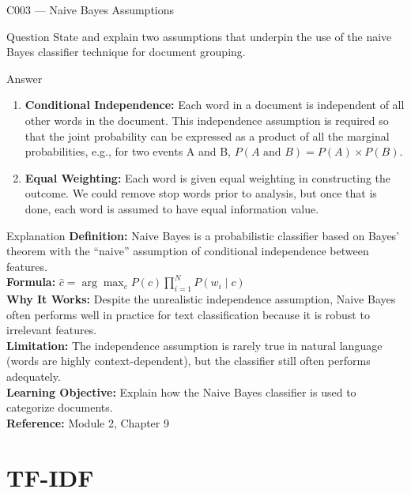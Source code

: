 \documentclass[aspectratio=169,8pt]{beamer}
\begin{document}
	\begin{frame}{C003 --- Naive Bayes Assumptions}
		\begin{block}{Question}
			State and explain two assumptions that underpin the use of the naive Bayes classifier technique for document grouping.
		\end{block}
		\begin{block}{Answer}
			\begin{enumerate}
				\item \textbf{Conditional Independence:} Each word in a document is independent of all other words in the document. This independence assumption is required so that the joint probability can be expressed as a product of all the marginal probabilities, e.g., for two events A and B, $P(A \text{ and } B) = P(A) \times P(B)$.\\
				\item \textbf{Equal Weighting:} Each word is given equal weighting in constructing the outcome. We could remove stop words prior to analysis, but once that is done, each word is assumed to have equal information value.
			\end{enumerate}
		\end{block}
		\begin{block}{Explanation}
			\textbf{Definition:} Naive Bayes is a probabilistic classifier based on Bayes' theorem with the ``naive'' assumption of conditional independence between features.\\
			\textbf{Formula:} $\hat{c} = \arg\max_{c} P(c) \prod_{i=1}^{N} P(w_i \mid c)$\\
			\textbf{Why It Works:} Despite the unrealistic independence assumption, Naive Bayes often performs well in practice for text classification because it is robust to irrelevant features.\\
			\textbf{Limitation:} The independence assumption is rarely true in natural language (words are highly context-dependent), but the classifier still often performs adequately.\\
			\textbf{Learning Objective:} Explain how the Naive Bayes classifier is used to categorize documents.\\
			\textbf{Reference:} Module 2, Chapter 9
		\end{block}
	\end{frame}
	
	\section{TF-IDF}
	
\end{document}
